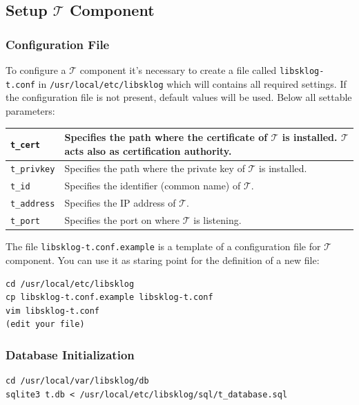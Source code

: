 \documentclass[a4paper,12pt]{article}
\def\t{$\mathcal{T}$\xspace}
\begin{document}
\subsection{Setup $\mathcal{T}$ Component}

\subsubsection{Configuration File}

To configure a \t component it's necessary to create a file called
\texttt{libsklog-t.conf} in \texttt{/usr/local/etc/libsklog} which
will contains all required settings. If the configuration file is
not present, default values will be used. Below all settable
parameters:

\begin{center}
\small{
\begin{tabular}{|p{}|p{}|}
\hline
\texttt{t\_cert} & Specifies the path where the certificate of \t is installed.
                   \t acts also as certification authority.\\ \hline
\texttt{t\_privkey} & Specifies the path where the private key of \t is
                      installed. \\ \hline
\texttt{t\_id} & Specifies the identifier (common name) of \t.\\ \hline
\texttt{t\_address} & Specifies the IP address of \t. \\ \hline
\texttt{t\_port} & Specifies the port on where \t is listening.\\ \hline
\end{tabular}
}
\end{center}

The file \texttt{libsklog-t.conf.example} is a template of a
configuration file for \t component. You can use it as staring point
for the definition of a new file:\ \\

\begin{lstlisting}
cd /usr/local/etc/libsklog
cp libsklog-t.conf.example libsklog-t.conf
vim libsklog-t.conf
(edit your file)
\end{lstlisting}

\subsubsection{Database Initialization}

\begin{lstlisting}
cd /usr/local/var/libsklog/db
sqlite3 t.db < /usr/local/etc/libsklog/sql/t_database.sql
\end{lstlisting}
\end{document}

